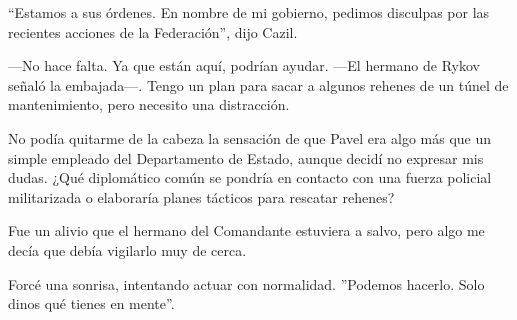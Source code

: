 ``Estamos a sus órdenes. En nombre de mi gobierno, pedimos disculpas por las recientes acciones de la Federación'', dijo Cazil.

—No hace falta. Ya que están aquí, podrían ayudar. —El hermano de Rykov señaló la embajada—. Tengo un plan para sacar a algunos rehenes de un túnel de mantenimiento, pero necesito una distracción.

No podía quitarme de la cabeza la sensación de que Pavel era algo más que un simple empleado del Departamento de Estado, aunque decidí no expresar mis dudas. ¿Qué diplomático común se pondría en contacto con una fuerza policial militarizada o elaboraría planes tácticos para rescatar rehenes?

Fue un alivio que el hermano del Comandante estuviera a salvo, pero algo me decía que debía vigilarlo muy de cerca.

Forcé una sonrisa, intentando actuar con normalidad. ''Podemos hacerlo. Solo dinos qué tienes en mente''.